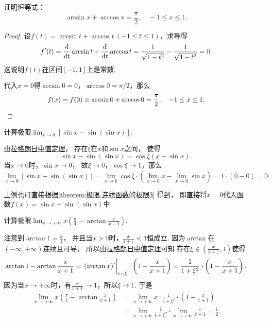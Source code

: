 \begin{example}
证明恒等式：\[
	\arcsin x + \arccos x = \frac{\pi}{2},
	\quad -1 \leq x \leq 1.
\]
\begin{proof}
设\(f(t) = \arcsin t + \arccos t\ (-1 \leq t \leq 1)\)，求导得\[
	f'(t) = \dv{t} \arcsin t + \dv{t} \arccos t
	= \frac{1}{\sqrt{1-t^2}} - \frac{1}{\sqrt{1-t^2}} = 0.
\]
这说明\(f(t)\)在区间\([-1,1]\)上是常数.

代入\(x=0\)得\(\arcsin 0 = 0\)，\(\arccos 0 = \pi/2\)，那么\[
	f(x) = f(0) \equiv \arcsin 0 + \arccos 0 = \frac{\pi}{2},
	\quad -1 \leq x \leq 1.
	\qedhere
\]
\end{proof}
\end{example}

\begin{example}
计算极限\(\lim_{x\to0} \left[\sin x - \sin(\sin x)\right]\).
\begin{solution}
由\hyperref[theorem:微分中值定理.拉格朗日中值定理]{拉格朗日中值定理}，
存在\(\xi\)在\(x\)和\(\sin x\)之间，
使得\[
	\sin x - \sin(\sin x)
	= \cos\xi (x-\sin x).
\]
当\(x\to0\)时，\(\sin x\to0\)，
故\(\xi\to0\)，\(\cos\xi\to1\)，那么\[
	\lim_{x\to0} \left[\sin x - \sin(\sin x)\right]
	= \lim_{x\to0} \cos\xi \cdot
		\left(\lim_{x\to0} x - \lim_{x\to0} \sin x\right)
	= 1 \cdot (0-0) = 0.
\]
\end{solution}
\end{example}
\begin{remark}
上例也可直接根据\cref{theorem:极限.连续函数的极限3} 得到，
即直接将\(x=0\)代入函数\(f(x) = \sin x - \sin(\sin x)\)中.
\end{remark}
\begin{example}%
计算极限\(\lim_{x\to+\infty} x \left( \frac\pi4 - \arctan\frac{x}{x+1} \right)\).
\begin{solution}
注意到\(\arctan1 = \frac\pi4\)，
并且当\(x>0\)时，\(\frac{x}{x+1} < 1\)恒成立.
因为\(\arctan\)在\((-\infty,+\infty)\)连续且可导，
所以由\hyperref[theorem:微分中值定理.拉格朗日中值定理]{拉格朗日中值定理}可知
存在\(\xi\in\left( \frac{x}{x+1},1 \right)\)使得\[
	\arctan1 - \arctan\frac{x}{x+1}
	= \eval{(\arctan x)'}_{x=\xi} \cdot \left( 1 - \frac{x}{x+1} \right)
	= \frac1{1+\xi^2} \cdot \left( 1 - \frac{x}{x+1} \right).
\]
因为当\(x\to+\infty\)时，有\(\frac{x}{x+1} \to 1\)，所以\(\xi \to 1\).
于是\begin{align*}
	\lim_{x\to+\infty} x \left( \frac\pi4 - \arctan\frac{x}{x+1} \right)
	&= \lim_{x\to+\infty} x
		\cdot \frac1{1+\xi^2}
		\cdot \left( 1 - \frac{x}{x+1} \right) \\
	&= \lim_{x\to+\infty} \frac1{1+\xi^2}
		\cdot \lim_{x\to+\infty} \frac{x}{x+1}
	= \frac12.
\end{align*}
\end{solution}
\end{example}
